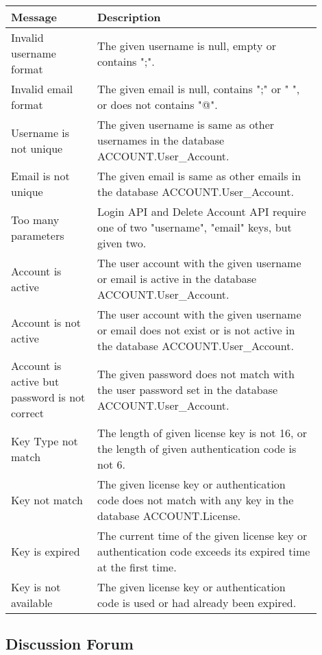 \documentclass[11pt, a4paper]{article}
\begin{document}
\begin{longtable}{|>{\centering\arraybackslash}m{0.25\linewidth}|>{\arraybackslash}m{0.65\linewidth}|} \hline
    Message &  Description\\ \hline
    Invalid username format &  The given username is null, empty or contains ";". \\ \hline 
    Invalid email format &  The given email is null, contains ";" or " ", or does not contains "@".  \\ \hline 
    Username is not unique &  The given username is same as other usernames in the database ACCOUNT.User_Account. \\ \hline 
    Email is not unique &  The given email is same as other emails in the database ACCOUNT.User_Account.  \\ \hline 
    Too many parameters &  Login API and Delete Account API require one of two "username", "email" keys, but given two.  \\ \hline 
    Account is active &  The user account with the given username or email is active in the database ACCOUNT.User_Account.  \\ \hline 
    Account is not active &  The user account with the given username or email does not exist or is not active in the database ACCOUNT.User_Account.  \\ \hline 
    Account is active but password is not correct &  The given password does not match with the user password set in the database ACCOUNT.User_Account.    \\ \hline 
    Key Type not match &  The length of given license key is not 16, or the length of given authentication code is not 6.    \\ \hline 
    Key not match &  The given license key or authentication code does not match with any key in the database ACCOUNT.License.    \\ \hline   
    Key is expired &  The current time of the given license key or authentication code exceeds its expired time at the first time.    \\ \hline   
    Key is not available &  The given license key or authentication code is used or had already been expired.    \\ \hline   
    
\end{longtable}

\subsection{Discussion Forum}
\end{document}
